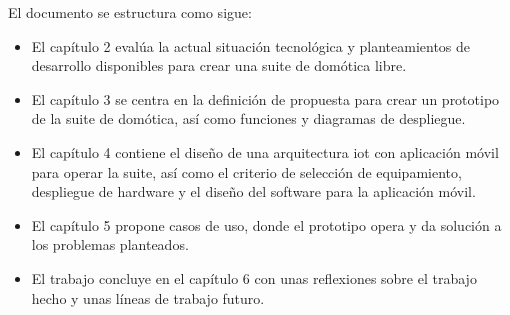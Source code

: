 El documento se estructura como sigue:

\begin{itemize}
  \item El capítulo 2 evalúa la actual situación tecnológica y planteamientos de desarrollo disponibles para crear una suite de domótica libre.

  \item El capítulo 3 se centra en la definición de propuesta para crear un prototipo de la suite de domótica, así como funciones y diagramas de despliegue.

  \item El capítulo 4 contiene el diseño de una arquitectura \gls{iot} con aplicación móvil para operar la suite, así como el criterio de selección de equipamiento, despliegue de hardware y el diseño del software para la aplicación móvil.

  \item El capítulo 5 propone casos de uso, donde el prototipo opera y da solución a los problemas planteados.

  \item El trabajo concluye en el capítulo 6 con unas reflexiones sobre el trabajo hecho y unas líneas de trabajo futuro.

\end{itemize}
